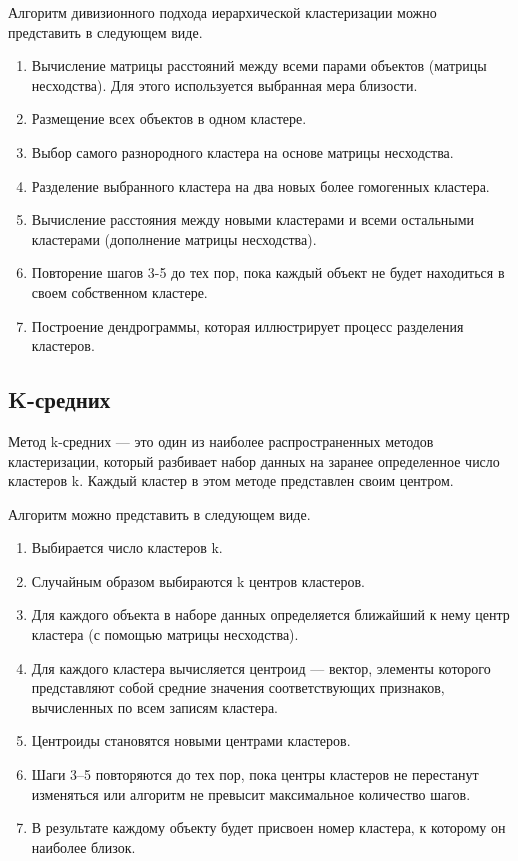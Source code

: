 Алгоритм дивизионного подхода иерархической кластеризации можно представить в следующем виде.

\begin{enumerate}
    \item Вычисление матрицы расстояний между всеми парами объектов (матрицы несходства). Для этого используется выбранная мера близости.
    \item Размещение всех объектов в одном кластере.
    \item Выбор самого разнородного кластера на основе матрицы несходства.
    \item Разделение выбранного кластера на два новых более гомогенных кластера.
    \item Вычисление расстояния между новыми кластерами и всеми остальными кластерами (дополнение матрицы несходства).
    \item Повторение шагов 3-5 до тех пор, пока каждый объект не будет находиться в своем собственном кластере.
    \item Построение дендрограммы, которая иллюстрирует процесс разделения кластеров.
\end{enumerate}



\subsection{K-средних}

Метод k-средних \cite{KmeansСlustering} --- это один из наиболее распространенных методов кластеризации, который разбивает набор данных на заранее определенное число кластеров k. Каждый кластер в этом методе представлен своим центром.

Алгоритм можно представить в следующем виде.

\begin{enumerate}
    \item Выбирается число кластеров k.
    \item Случайным образом выбираются k центров кластеров.
    \item Для каждого объекта в наборе данных определяется ближайший к нему центр кластера (с помощью матрицы несходства).
    \item Для каждого кластера вычисляется центроид --- вектор, элементы которого представляют собой средние значения соответствующих признаков, вычисленных по всем записям кластера.
    \item Центроиды становятся новыми центрами кластеров.
    \item Шаги 3--5 повторяются до тех пор, пока центры кластеров не перестанут изменяться или алгоритм не превысит максимальное количество шагов.
    \item В результате каждому объекту будет присвоен номер кластера, к которому он наиболее близок.
\end{enumerate}

